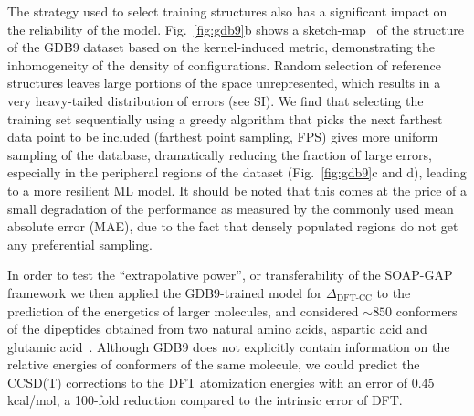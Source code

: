 \documentclass[12pt]{article}
\begin{document}
The strategy used to 
select training structures also has a significant
impact on the reliability of the model.
Fig.~\ref{fig:gdb9}b shows a 
sketch-map~\cite{ceri+11pnas} of the structure of the GDB9 dataset
based on the kernel-induced metric, demonstrating
the inhomogeneity of the density of 
configurations. Random selection of reference 
structures leaves large portions of the 
space unrepresented, which results in a very 
heavy-tailed distribution of errors (see SI). We find that
selecting the training set sequentially using a 
greedy algorithm that picks the next farthest 
data point to be included (farthest point sampling, FPS)
gives more uniform sampling of the database, 
 dramatically reducing the fraction of large errors,
especially in the peripheral regions of the dataset (Fig.~\ref{fig:gdb9}c and d),
%
%
leading to a more resilient ML model. 
It should be noted that this comes at the price of a small degradation 
of the performance as measured by the commonly used mean absolute error (MAE),
due to the fact that densely populated regions 
do not get any preferential sampling.
%
%
%
%

In order to test the ``extrapolative power'', or transferability
of the SOAP-GAP framework we then
applied the GDB9-trained model for $\Delta_\text{DFT-CC}$ to the prediction
of the energetics of larger molecules, and
considered $\sim 850$ conformers of the 
dipeptides obtained from two natural amino acids, aspartic
acid and glutamic acid~\cite{ropo+16sd}. Although GDB9 does not
explicitly contain information on the 
relative energies of conformers of the same molecule, 
we could predict the CCSD(T) corrections to the 
DFT atomization energies
with an error of 0.45 kcal/mol, a 100-fold 
reduction compared to the intrinsic error of DFT. 
\end{document}
